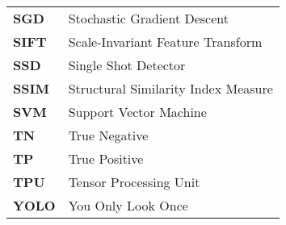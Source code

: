 \begin{longtable}{ll}
    \textbf{SGD} & Stochastic Gradient Descent \\
    \textbf{SIFT} & Scale-Invariant Feature Transform \\
    \textbf{SSD} & Single Shot Detector \\
    \textbf{SSIM} & Structural Similarity Index Measure \\
    \textbf{SVM} & Support Vector Machine \\
    \textbf{TN} & True Negative \\
    \textbf{TP} & True Positive \\
    \textbf{TPU} & Tensor Processing Unit \\
    \textbf{YOLO} & You Only Look Once \\

\end{longtable}